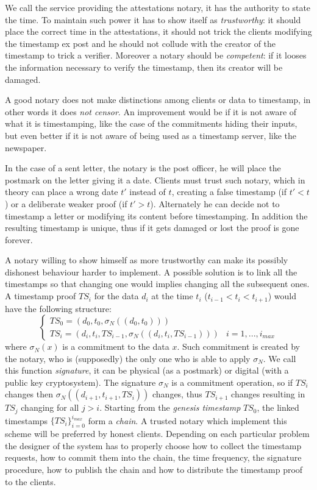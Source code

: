 We call the service providing the attestations notary, it has the authority to state the time. To maintain such power it has to show itself as \textit{trustworthy}: it should place the correct time in the attestations, it should not trick the clients modifying the timestamp ex post and he should not collude with the creator of the timestamp to trick a verifier. Moreover a notary should be \textit{competent}: if it looses the information necessary to verify the timestamp, then its creator will be damaged.

A good notary does not make distinctions among clients or data to timestamp, in other words it does \textit{not censor}. An improvement would be if it is not aware of what it is timestamping, like the case of the commitments hiding their inputs, but even better if it is not aware of being used as a timestamp server, like the newspaper.

In the case of a sent letter, the notary is the post officer, he will place the postmark on the letter giving it a date. 
Clients must trust such notary, which in theory can place a wrong date $t'$ instead of $t$, creating a false timestamp (if $t'<t$) or a deliberate weaker proof (if $t'>t$). Alternately he can decide not to timestamp a letter or modifying its content before timestamping. In addition the resulting timestamp is unique, thus if it gets damaged or lost the proof is gone forever.

A notary willing to show himself as more trustworthy can make its possibly dishonest behaviour harder to implement. A possible solution is to link all the timestamps so that changing one would implies changing all the subsequent ones. A timestamp proof $TS_i$ for the data $d_i$ at the time $t_i$ ($t_{i-1}<t_i<t_{i+1}$) would have the following structure:
\begin{equation}
	\label{singed-chain}
	\begin{cases}
		TS_0 =(d_0,t_0, \sigma_N((d_0,t_0))) & 
		\\
		TS_i =(d_i,t_i,TS_{i-1}, \sigma_N((d_i,t_i,TS_{i-1}))) & i = 1, ..., i_{max}		
	\end{cases}
\end{equation}
where $\sigma_N (x)$ is a commitment to the data $x$. Such commitment is created by the notary, who is (supposedly) the only one who is able to apply $\sigma_N$. We call this function \textit{signature}, it can be physical (as a postmark) or digital (with a public key cryptosystem). The signature $\sigma_N$ is a commitment operation, so if $TS_{i}$ changes then $\sigma_N((d_{i+1},t_{i+1},TS_i))$ changes, thus $TS_{i+1}$ changes resulting in $TS_j$ changing for all $j>i$. Starting from the \textit{genesis timestamp} $TS_0$, the linked timestamps $\{ TS_{i} \}_{i=0}^{i_{max}}$ form a \textit{chain}. A trusted notary which implement this scheme will be preferred by honest clients. Depending on each particular problem the designer of the system has to properly choose how to collect the timestamp requests, how to commit them into the chain, the time frequency, the signature procedure, how to publish the chain and how to distribute the timestamp proof to the clients.


